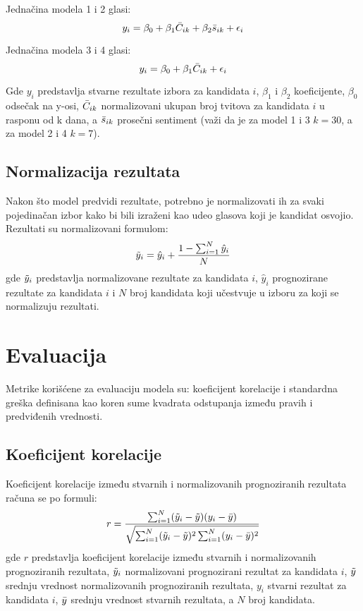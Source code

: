 Jednačina modela 1 i 2 glasi:
\begin{equation*}
    y_i = \beta_0 + \beta_1 \Bar{C}_{ik} + \beta_2 \Bar{s}_{ik} + \epsilon_i
\end{equation*}

Jednačina modela 3 i 4 glasi:
\begin{equation*}
    y_i = \beta_0 + \beta_1 \Bar{C}_{ik} + \epsilon_i
\end{equation*}

Gde $y_i$ predstavlja stvarne rezultate izbora za kandidata $i$, $\beta_1$ i $\beta_2$ koeficijente, $\beta_0$ odsečak na y-osi, $\Bar{C}_{ik}$ normalizovani ukupan broj tvitova za kandidata $i$ u rasponu od k dana, a $\Bar{s}_{ik}$ prosečni sentiment (važi da je za model 1 i 3 $k = 30$, a za model 2 i 4 $k = 7$).

\subsection{Normalizacija rezultata}

Nakon što model predvidi rezultate, potrebno je normalizovati ih za svaki pojedinačan izbor kako bi bili izraženi kao udeo glasova koji je kandidat osvojio. Rezultati su normalizovani formulom:
\begin{equation*}
    \Tilde{y}_i = \hat{y}_i + \frac{1 - \sum^N_{i=1}\hat{y}_i}{N}
\end{equation*}
gde $\Tilde{y}_i$ predstavlja normalizovane rezultate za kandidata $i$, $\hat{y}_i$ prognozirane rezultate za kandidata $i$ i $N$ broj kandidata koji učestvuje u izboru za koji se normalizuju rezultati.

\section{Evaluacija}

Metrike korišćene za evaluaciju modela su: koeficijent korelacije i standardna greška definisana kao koren sume kvadrata odstupanja između pravih i predviđenih vrednosti.

\subsection{Koeficijent korelacije}

Koeficijent korelacije između stvarnih i normalizovanih prognoziranih rezultata računa se po formuli:
\begin{equation*}
    r = \frac{
        \sum^N_{i=1}(\Tilde{y}_i - \Tilde{y})(y_i - \Bar{y})
    }{
        \sqrt{\sum^N_{i=1}(\Tilde{y}_i - \Tilde{y})^2\sum^N_{i=1}(y_i - \Bar{y})^2}
    }
\end{equation*}
gde $r$ predstavlja koeficijent korelacije između stvarnih i normalizovanih prognoziranih rezultata, $\Tilde{y}_i$
normalizovani prognozirani rezultat za kandidata $i$, $\Tilde{y}$ srednju vrednost normalizovanih prognoziranih
rezultata, $y_i$ stvarni rezultat za kandidata $i$, $\Bar{y}$ srednju vrednost stvarnih rezultata, a $N$ broj kandidata.

